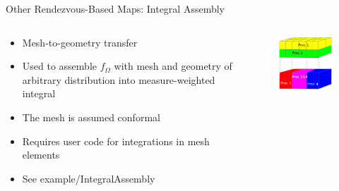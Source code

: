 \documentclass{beamer}
\begin{document}
\begin{frame}{Other Rendezvous-Based Maps: Integral Assembly}

  \begin{columns}
    
    \begin{column}{0.4\textwidth}
      \begin{itemize}
      \item Mesh-to-geometry transfer
        \medskip
      \item Used to assemble $f_{\Omega}$ with mesh and geometry of
        arbitrary distribution into measure-weighted integral
        \medskip
      \item The mesh is assumed conformal
        \medskip
      \item Requires user code for integrations in mesh elements
        \medskip
      \item See example/IntegralAssembly
      \end{itemize}
    \end{column}

    \begin{column}{0.6\textwidth}
      \begin{figure}
      \centering
      \includegraphics[width=2.5in]{integral_assembly.png}
      \end{figure}
    \end{column}

  \end{columns}

\end{frame}
\end{document}
